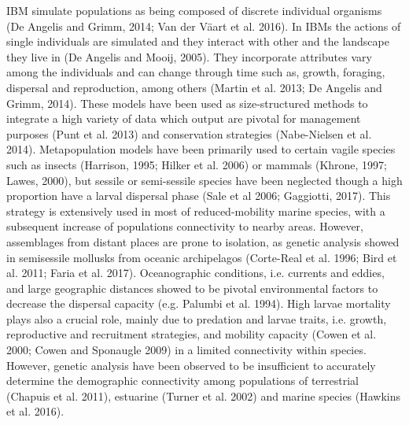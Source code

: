 \documentclass[12pt]{article}
\begin{document}
\begin{flushleft}
IBM simulate populations as being composed of discrete individual organisms (De Angelis and Grimm, 2014; Van der Väart et al. 2016). In IBMs the actions of single individuals are simulated and they interact with other and the landscape they live in (De Angelis and Mooij, 2005). They incorporate attributes vary among the individuals and can change through time such as, growth, foraging, dispersal and reproduction, among others (Martin et al. 2013; De Angelis and Grimm, 2014). These models have been used as size-structured methods to integrate a high variety of data which output are pivotal for management purposes (Punt et al. 2013) and conservation strategies (Nabe-Nielsen et al. 2014). Metapopulation models have been primarily used to certain vagile species such as insects (Harrison, 1995; Hilker et al. 2006) or mammals (Khrone, 1997; Lawes, 2000), but sessile or semi-sessile species have been neglected though a high proportion have a larval dispersal phase (Sale et al 2006; Gaggiotti, 2017). This strategy is extensively used in most of reduced-mobility marine species, with a subsequent increase of populations connectivity to nearby areas. However, assemblages from distant places are prone to isolation, as genetic analysis showed in semisessile mollusks from oceanic archipelagos (Corte-Real et al. 1996; Bird et al. 2011; Faria et al. 2017). Oceanographic conditions, i.e. currents and eddies, and large geographic distances showed to be pivotal environmental factors to decrease the dispersal capacity (e.g. Palumbi et al. 1994). High larvae mortality plays also a crucial role, mainly due to predation and larvae traits, i.e. growth, reproductive and recruitment strategies, and mobility capacity (Cowen et al. 2000; Cowen and Sponaugle 2009) in a limited connectivity within species. However, genetic analysis have been observed to be insufficient to accurately determine the demographic connectivity among populations of terrestrial (Chapuis et al. 2011), estuarine (Turner et al. 2002) and marine species (Hawkins et al. 2016).

\end{flushleft}
\end{document}
